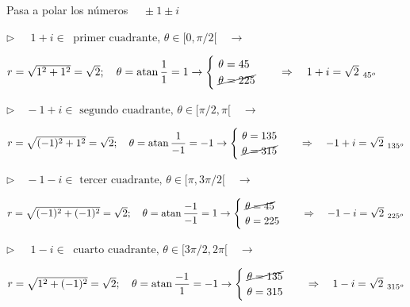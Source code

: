 \vspace{10mm}
\begin{miejemplo}

Pasa a polar los números $\quad \pm 1\pm i$

\vspace{4mm} $\triangleright \quad \ \  1+i  \in \ \text{ primer cuadrante, } \theta \in [0,\pi/2[ \quad \to \ $	

\vspace{2mm} $r=\sqrt{1^2+1^2}=\sqrt{2};\quad \theta=\atan \dfrac{1}{1}=1 \to \begin{cases} \ \theta=45 \\ \ \cancel{\theta=225} \end{cases} \quad \Rightarrow \quad 1+i=\sqrt{2}_{\ 45^o}$


\vspace{4mm} $\triangleright \quad -1+i \in \text{ segundo cuadrante, }  \theta \in [\pi/2,\pi[  \quad \to \ $

\vspace{2mm} $r=\sqrt{(-1)^2+1^2}=\sqrt{2};\quad \theta=\atan \dfrac{1}{-1}=-1 \to \begin{cases} \ \theta=135 \\ \ \cancel{\theta=315} \end{cases} \quad \Rightarrow \quad -1+i=\sqrt{2}_{\ 135^o}$

\vspace{4mm} $\triangleright \quad -1-i \in \text{ tercer cuadrante, }  \theta \in [\pi,3\pi/2[ \quad \to \ $

\vspace{2mm} $r=\sqrt{(-1)^2+(-1)^2}=\sqrt{2};\quad \theta=\atan \dfrac{-1}{-1}=1 \to \begin{cases} \ \cancel{\theta=45} \\ \ \theta=225 \end{cases} \quad \Rightarrow \quad -1-i=\sqrt{2}_{\ 225^o}$

\vspace{4mm} $\triangleright \quad \ \ 1-i \in \ \text{ cuarto cuadrante, }  \theta \in [3\pi/2,2\pi[ \quad \to \ $	

\vspace{2mm} $r=\sqrt{1^2+(-1)^2}=\sqrt{2};\quad \theta=\atan \dfrac{-1}{1}=-1 \to \begin{cases} \ \cancel{\theta=135} \\ \ \theta=315  \end{cases} \quad \Rightarrow \quad 1-i=\sqrt{2}_{\ 315^o}$

\end{miejemplo}

